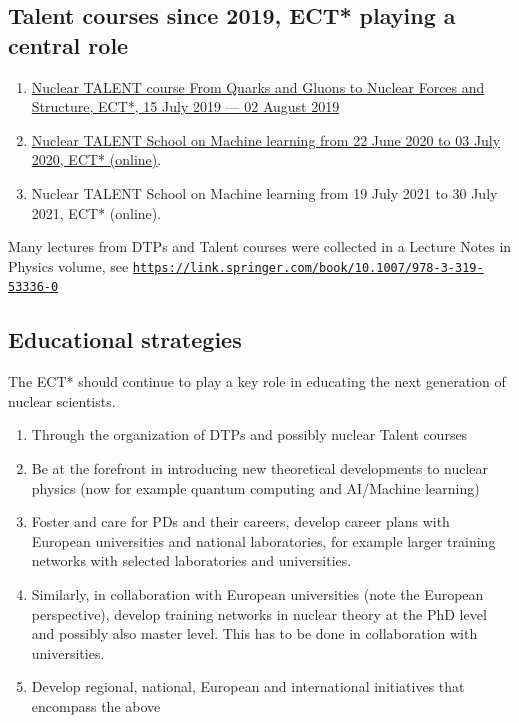 \documentclass[%
oneside,                 %
final,                   %
10pt]{article}
\begin{document}
\vspace{6mm}

\subsection{Talent courses since 2019, ECT* playing a central role}

\begin{block}{}
\begin{enumerate}
\item \href{{https://www.ectstar.eu/talents/talent-2019/}}{Nuclear TALENT course From Quarks and Gluons to Nuclear Forces and Structure, ECT*, 15 July 2019 — 02 August 2019}

\item \href{{https://www.ectstar.eu/talents/talent-school-special-edition-2020/}}{Nuclear TALENT School on Machine learning from 22 June 2020 to 03 July 2020, ECT* (online)}. 

\item Nuclear TALENT School on Machine learning from 19 July 2021 to  30 July 2021, ECT* (online). 
\end{enumerate}

\noindent
\end{block}

Many lectures from DTPs and Talent courses were collected in a Lecture Notes in Physics volume, see \href{{https://link.springer.com/book/10.1007/978-3-319-53336-0}}{\nolinkurl{https://link.springer.com/book/10.1007/978-3-319-53336-0}}

\subsection{Educational strategies}

The ECT* should continue to play a key role in educating the next generation of nuclear scientists.

\begin{enumerate}
\item Through the organization of DTPs and possibly nuclear Talent courses

\item Be at the forefront in introducing new theoretical developments to nuclear physics (now for example quantum computing and AI/Machine learning)

\item Foster and care for PDs and their careers, develop career plans with European universities and national laboratories, for example larger training networks with selected laboratories and universities. 

\item Similarly, in collaboration with European universities (note the European perspective), develop training networks in nuclear theory at the PhD level and possibly also master level. This has to be done in collaboration with universities.

\item Develop regional, national, European and international initiatives that encompass the above
\end{enumerate}
\end{document}

